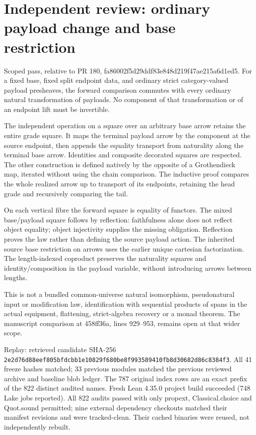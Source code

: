 \documentclass{article}
\begin{document}
\section*{Independent review: ordinary payload change and base restriction}
Scoped pass, relative to PR 180, fa86002f5d29ddf83e848d219f47ae215a6d1ed5. For a fixed base, fixed split endpoint data, and ordinary strict category-valued payload presheaves, the forward comparison commutes with every ordinary natural transformation of payloads. No component of that transformation or of an endpoint lift must be invertible.
\par The independent operation on a square over an arbitrary base arrow retains the entire grade square. It maps the terminal payload arrow by the component at the source endpoint, then appends the equality transport from naturality along the terminal base arrow. Identities and composite decorated squares are respected. The other construction is defined natively by the opposite of a Grothendieck map, iterated without using the chain comparison. The inductive proof compares the whole realized arrow up to transport of its endpoints, retaining the head grade and recursively comparing the tail.
\par On each vertical fibre the forward square is equality of functors. The mixed base/payload square follows by reflection: faithfulness alone does not reflect object equality; object injectivity supplies the missing obligation. Reflection proves the law rather than defining the source payload action. The inherited source base restriction on arrows uses the earlier unique cartesian factorization. The length-indexed coproduct preserves the naturality squares and identity/composition in the payload variable, without introducing arrows between lengths.
\par This is not a bundled common-universe natural isomorphism, pseudonatural input or modification law, identification with sequential products of spans in the actual equipment, flattening, strict-algebra recovery or a monad theorem. The manuscript comparison at 458ff36a, lines 929--953, remains open at that wider scope.
\par Replay: retrieved candidate SHA-256
\texttt{2e2d76d88eef805bfdcbb1e10829f680be8f993589410fb8d30682d86c8384f3}.
All 41 freeze hashes matched; 33 previous modules matched the previous reviewed archive and baseline blob ledger. The 787 original index rows are an exact prefix of the 822 distinct audited names. Fresh Lean 4.35.0 project build succeeded (748 Lake jobs reported). All 822 audits passed with only propext, Classical.choice and Quot.sound permitted; nine external dependency checkouts matched their manifest revisions and were tracked-clean. Their cached binaries were reused, not independently rebuilt.
\end{document}
